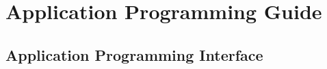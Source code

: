\documentclass[a4paper,fontsize=10pt,twoside,DIV15,BCOR12mm,headinclude=true,footinclude=false,pagesize,bibtotoc]{scrbook}
\newcommand{\code}[1]{{\texttt{#1}}}
\newcommand{\comment}[3]{

\textsf{\textbf{#1}} {\color{#3}#2}}
\newcommand{\martin}[1]{\comment{Martin}{#1}{Blue}}
\begin{document}
%
%
%
%
%
%
%
%

\section{Application Programming Guide}
\label{sec:apg}

\subsection{Application Programming Interface}
\end{document}
